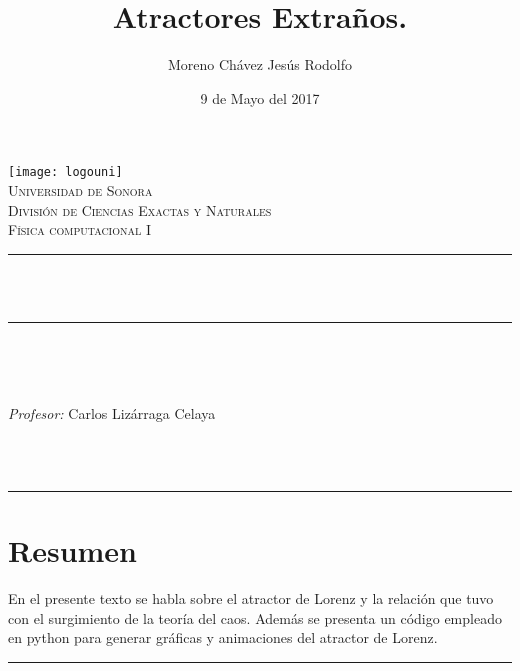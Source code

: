 \documentclass[12pt]{article}
\title{Atractores Extraños.}%
\author{\centering Moreno Chávez Jesús Rodolfo}											%
\date{9 de Mayo del 2017} %
\makeatletter
\let\thetitle\@title
\let\theauthor\@author
\let\thedate\@date
\makeatother
\begin{document}

\begin{titlepage}
	\centering
    \vspace*{0.5 cm}
    \texttt{[image: logouni]}\\[0.5 cm]	%
    \textsc{\Large Universidad de Sonora}\\[1.0 cm]	%
	\textsc{\Large División de Ciencias Exactas y Naturales}\\[0.5 cm]				%
	\textsc{\large Física computacional I}\\[0.5 cm]				%
	\rule{\linewidth}{0.2 mm} \\[0.4 cm]
	{ \huge \bfseries \thetitle}\\
	\rule{\linewidth}{0.2 mm} \\[0.5 cm]
	
	\begin{minipage}{\textwidth}
		\begin{flushleft} 
			\emph{\Large} \large \\
			\theauthor
			\end{flushleft}
	
		\begin{flushleft} 
			\emph{\Large Profesor:} \large \centering Carlos Lizárraga Celaya 	
			\end{flushleft}
	\end{minipage}\\[1 cm]
	{\large \thedate}\\[2 cm]
 
	\vfill
	
\end{titlepage}

\newpage
\hrule 
\section*{Resumen}
En el presente texto se habla sobre el atractor de Lorenz y la relación que tuvo con el surgimiento de la teoría del caos. Además se presenta un código empleado en python para generar gráficas y animaciones del atractor de Lorenz.
\vspace{0.5 cm}
\hrule
\vspace{0.9 cm}


\newpage 
\end{document}
